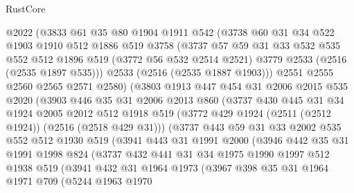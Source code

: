 \begin{lexlean}{RustCore}
\begin{coremodule}
        @2022
        (@3833
          @61
          @35
          @80
          @1904
          @1911
          @542
          (@3738
            @60
            @31
            @34
            @522
            @1903
            @1910
            @512
            @1886
            @519
            @3758
            (@3737
              @57
              @59
              @31
              @33
              @532
              @535
              @552
              @512
              @1896
              @519
              (@3772 @56 @532 @2514 @2521)
              @3779
              @2533
              (@2516 (@2535 @1897 @535)))
            @2533
            (@2516 (@2535 @1887 @1903)))
          @2551
          @2555
          @2560
          @2565
          @2571
          @2580)
        (@3803
          @1913
          @447
          @454
          @31
          @2006
          @2015
          @535
          @2020
          (@3903
            @446
            @35
            @31
            @2006
            @2013
            @860
            (@3737
              @430
              @445
              @31
              @34
              @1924
              @2005
              @2012
              @512
              @1918
              @519
              (@3772 @429 @1924 (@2511 (@2512 @1924)) (@2516 (@2518 @429 @31)))
              (@3737
                @443
                @59
                @31
                @33
                @2002
                @535
                @552
                @512
                @1930
                @519
                (@3941
                  @443
                  @31
                  @1991
                  @2000
                  (@3946
                    @442
                    @35
                    @31
                    @1991
                    @1998
                    @824
                    (@3737
                      @432
                      @441
                      @31
                      @34
                      @1975
                      @1990
                      @1997
                      @512
                      @1938
                      @519
                      (@3941
                        @432
                        @31
                        @1964
                        @1973
                        (@3967
                          @398
                          @35
                          @31
                          @1964
                          @1971
                          @709
                          (@5244
                            @1963
                            @1970

\end{coremodule}
\end{lexlean}
